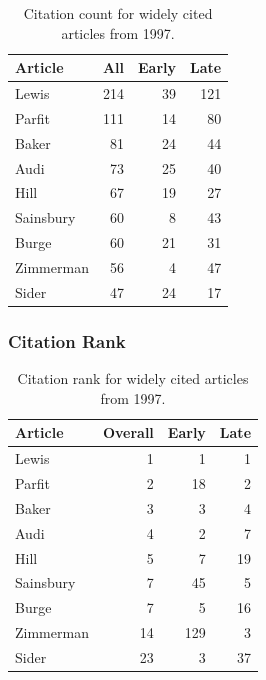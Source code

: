 \documentclass[
  10pt,
  letterpaper,
  DIV=11,
  numbers=noendperiod,
  twoside]{scrartcl}
\begin{document}
\begin{longtable}[]{@{}lrrr@{}}

\caption{\label{tbl-citation-count-1997}Citation count for widely cited
articles from 1997.}

\tabularnewline

\toprule\noalign{}
Article & All & Early & Late \\
\midrule\noalign{}
\endhead
\bottomrule\noalign{}
\endlastfoot
Lewis & 214 & 39 & 121 \\
Parfit & 111 & 14 & 80 \\
Baker & 81 & 24 & 44 \\
Audi & 73 & 25 & 40 \\
Hill & 67 & 19 & 27 \\
Sainsbury & 60 & 8 & 43 \\
Burge & 60 & 21 & 31 \\
Zimmerman & 56 & 4 & 47 \\
Sider & 47 & 24 & 17 \\

\end{longtable}

\subsubsection*{Citation Rank}\label{sec-rank-1997}

\begin{longtable}[]{@{}lrrr@{}}

\caption{\label{tbl-citation-rank-1997}Citation rank for widely cited
articles from 1997.}

\tabularnewline

\toprule\noalign{}
Article & Overall & Early & Late \\
\midrule\noalign{}
\endhead
\bottomrule\noalign{}
\endlastfoot
Lewis & 1 & 1 & 1 \\
Parfit & 2 & 18 & 2 \\
Baker & 3 & 3 & 4 \\
Audi & 4 & 2 & 7 \\
Hill & 5 & 7 & 19 \\
Sainsbury & 7 & 45 & 5 \\
Burge & 7 & 5 & 16 \\
Zimmerman & 14 & 129 & 3 \\
Sider & 23 & 3 & 37 \\

\end{longtable}
\end{document}
